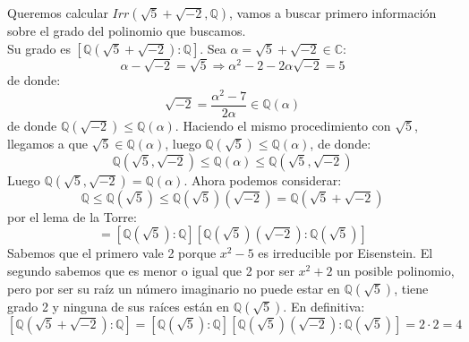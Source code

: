 \begin{ejemplo}
    Queremos calcular $Irr\left(\sqrt{5}+\sqrt{-2}, \mathbb{Q}\right)$, vamos a buscar primero información sobre el grado del polinomio que buscamos.\\

    \noindent
    Su grado es $\left[\mathbb{Q}(\sqrt{5}+\sqrt{-2}):\mathbb{Q}\right]$. Sea $\alpha = \sqrt{5}+\sqrt{-2}\in \mathbb{C}$: 
    \begin{equation*}
        \alpha-\sqrt{-2} = \sqrt{5} \Longrightarrow \alpha^2 -2 -2\alpha\sqrt{-2} = 5
    \end{equation*}
    de donde:
    \begin{equation*}
        \sqrt{-2} = \dfrac{\alpha^2-7}{2\alpha} \in  \mathbb{Q}(\alpha)
    \end{equation*}
    de donde $\mathbb{Q}(\sqrt{-2}) \leq \mathbb{Q}(\alpha)$. Haciendo el mismo procedimiento con $\sqrt{5}$, llegamos a que $\sqrt{5}\in \mathbb{Q}(\alpha)$, luego $\mathbb{Q}\left(\sqrt{5}\right)\leq \mathbb{Q}(\alpha)$, de donde:
    \begin{equation*}
        \mathbb{Q}\left(\sqrt{5},\sqrt{-2}\right) \leq \mathbb{Q}(\alpha) \leq \mathbb{Q}\left(\sqrt{5},\sqrt{-2}\right)
    \end{equation*}
    Luego $\mathbb{Q}\left(\sqrt{5},\sqrt{-2}\right) = \mathbb{Q}(\alpha)$. Ahora podemos considerar:
    \begin{equation*}
        \mathbb{Q} \leq \mathbb{Q}\left(\sqrt{5}\right) \leq \mathbb{Q}\left(\sqrt{5}\right)\left(\sqrt{-2}\right) = \mathbb{Q}\left(\sqrt{5}+\sqrt{-2}\right)
    \end{equation*}
    por el lema de la Torre:
    \begin{equation*}
        [\mathbb{Q}(\sqrt{5}+\sqrt{-2}):\mathbb{Q}] = \left[\mathbb{Q}\left(\sqrt{5}\right):\mathbb{Q}\right] \left[\mathbb{Q}\left(\sqrt{5}\right)\left(\sqrt{-2}\right):\mathbb{Q}\left(\sqrt{5}\right)\right]
    \end{equation*}
    Sabemos que el primero vale 2 porque $x^2-5$ es irreducible por Eisenstein. El segundo sabemos que es menor o igual que 2 por ser $x^2+2$ un posible polinomio, pero por ser su raíz un número imaginario no puede estar en $\mathbb{Q}(\sqrt{5})$, tiene grado 2 y ninguna de sus raíces están en $\mathbb{Q}(\sqrt{5})$. En definitiva:
    \begin{equation*}
        \left[\mathbb{Q}(\sqrt{5}+\sqrt{-2}):\mathbb{Q}\right] = \left[\mathbb{Q}\left(\sqrt{5}\right):\mathbb{Q}\right] \left[\mathbb{Q}\left(\sqrt{5}\right)\left(\sqrt{-2}\right):\mathbb{Q}\left(\sqrt{5}\right)\right] = 2\cdot 2 =  4

\end{equation*}
\end{ejemplo}
